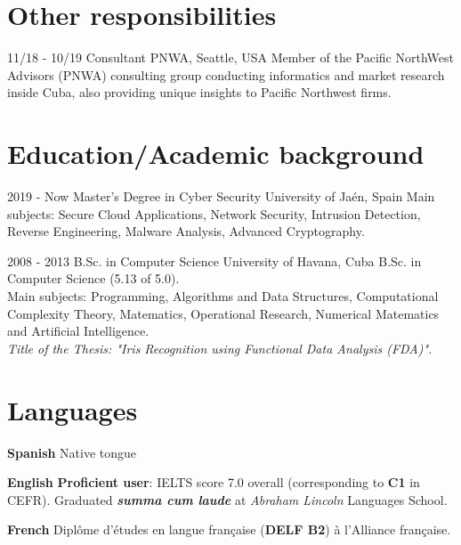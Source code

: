\documentclass[]{friggeri-cv}
\begin{document}
\section{Other responsibilities}
\begin{entrylist}
  \entry
    {11/18 - 10/19}
    {Consultant}
    {PNWA, Seattle, USA}
    {Member of the Pacific NorthWest Advisors (PNWA) consulting group conducting informatics and market research inside Cuba, also providing unique insights to Pacific Northwest firms.}
\end{entrylist}

\section{Education/Academic background}
\begin{entrylist}
  \entry
    {2019 - Now}
    {Master's Degree in Cyber Security}
    {University of Jaén, Spain}
    {
    	Main subjects: Secure Cloud Applications, Network Security, Intrusion Detection, Reverse Engineering, Malware Analysis, Advanced Cryptography.\\
    }

  \entry
    {2008 - 2013}
    {B.Sc. in Computer Science}
    {University of Havana, Cuba}
    {B.Sc. in Computer Science (5.13 of 5.0).\\ Main subjects: Programming, Algorithms and Data Structures, Computational Complexity Theory, Matematics, Operational Research, Numerical Matematics and Artificial Intelligence.\\
    \emph{Title of the Thesis: "Iris Recognition using Functional Data Analysis (FDA)".}}

\end{entrylist}

\pagebreak

\section{Languages}
\begin{entrylist}
  \entry
    {\textbf{Spanish}}
    {}
    {}
    {Native tongue}

  \entry
    {\textbf{English}}
    {}
    {}
    {
    	\textbf{Proficient user}: IELTS score 7.0 overall (corresponding to \textbf{C1} in CEFR). 
    	Graduated \textbf{\emph{summa cum laude}} at \emph{Abraham Lincoln} Languages School.\\
    }

  \entry
    {\textbf{French}}
    {}
    {}
    {Diplôme d'études en langue française (\textbf{DELF B2}) à l'Alliance française.}
\end{entrylist}
\end{document}
